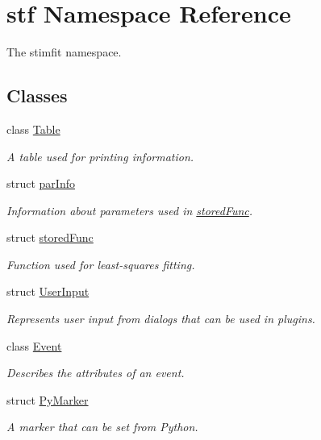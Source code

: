 \hypertarget{namespacestf}{
\section{stf Namespace Reference}
\label{namespacestf}
}


The stimfit namespace.  


\subsection*{Classes}
\begin{DoxyCompactItemize}
\item 
class \hyperlink{classstf_1_1Table}{Table}
\begin{DoxyCompactList}\small\item\em A table used for printing information. \item\end{DoxyCompactList}\item 
struct \hyperlink{structstf_1_1parInfo}{parInfo}
\begin{DoxyCompactList}\small\item\em Information about parameters used in \hyperlink{structstf_1_1storedFunc}{storedFunc}. \item\end{DoxyCompactList}\item 
struct \hyperlink{structstf_1_1storedFunc}{storedFunc}
\begin{DoxyCompactList}\small\item\em Function used for least-\/squares fitting. \item\end{DoxyCompactList}\item 
struct \hyperlink{structstf_1_1UserInput}{UserInput}
\begin{DoxyCompactList}\small\item\em Represents user input from dialogs that can be used in plugins. \item\end{DoxyCompactList}\item 
class \hyperlink{classstf_1_1Event}{Event}
\begin{DoxyCompactList}\small\item\em Describes the attributes of an event. \item\end{DoxyCompactList}\item 
struct \hyperlink{structstf_1_1PyMarker}{PyMarker}
\begin{DoxyCompactList}\small\item\em A marker that can be set from Python. \item\end{DoxyCompactList}\item 

\end{DoxyCompactItemize}

